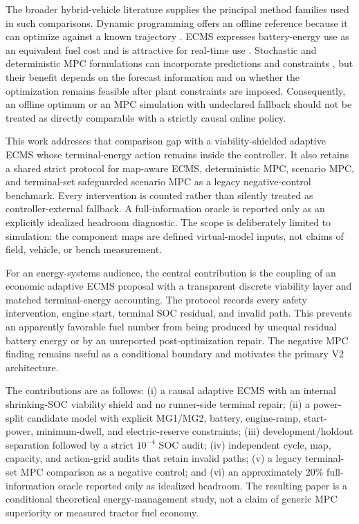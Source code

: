 \documentclass[energies,article,submit,moreauthors]{Definitions/mdpi}
\begin{document}
The broader hybrid-vehicle literature supplies the principal method families used in such comparisons. Dynamic programming offers an offline reference because it can optimize against a known trajectory \cite{xie2016}. ECMS expresses battery-energy use as an equivalent fuel cost and is attractive for real-time use \cite{musardo2005}. Stochastic and deterministic MPC formulations can incorporate predictions and constraints \cite{ripaccioli2010,zhang2017,wang2016}, but their benefit depends on the forecast information and on whether the optimization remains feasible after plant constraints are imposed. Consequently, an offline optimum or an MPC simulation with undeclared fallback should not be treated as directly comparable with a strictly causal online policy.

This work addresses that comparison gap with a viability-shielded adaptive ECMS whose terminal-energy action remains inside the controller. It also retains a shared strict protocol for map-aware ECMS, deterministic MPC, scenario MPC, and terminal-set safeguarded scenario MPC as a legacy negative-control benchmark. Every intervention is counted rather than silently treated as controller-external fallback. A full-information oracle is reported only as an explicitly idealized headroom diagnostic. The scope is deliberately limited to simulation: the component maps are defined virtual-model inputs, not claims of field, vehicle, or bench measurement.

For an energy-systems audience, the central contribution is the coupling of an economic adaptive ECMS proposal with a transparent discrete viability layer and matched terminal-energy accounting. The protocol records every safety intervention, engine start, terminal SOC residual, and invalid path. This prevents an apparently favorable fuel number from being produced by unequal residual battery energy or by an unreported post-optimization repair. The negative MPC finding remains useful as a conditional boundary and motivates the primary V2 architecture.

The contributions are as follows: (i) a causal adaptive ECMS with an internal shrinking-SOC viability shield and no runner-side terminal repair; (ii) a power-split candidate model with explicit MG1/MG2, battery, engine-ramp, start-power, minimum-dwell, and electric-reserve constraints; (iii) development/holdout separation followed by a strict $10^{-4}$ SOC audit; (iv) independent cycle, map, capacity, and action-grid audits that retain invalid paths; (v) a legacy terminal-set MPC comparison as a negative control; and (vi) an approximately 20\% full-information oracle reported only as idealized headroom. The resulting paper is a conditional theoretical energy-management study, not a claim of generic MPC superiority or measured tractor fuel economy.
\end{document}
